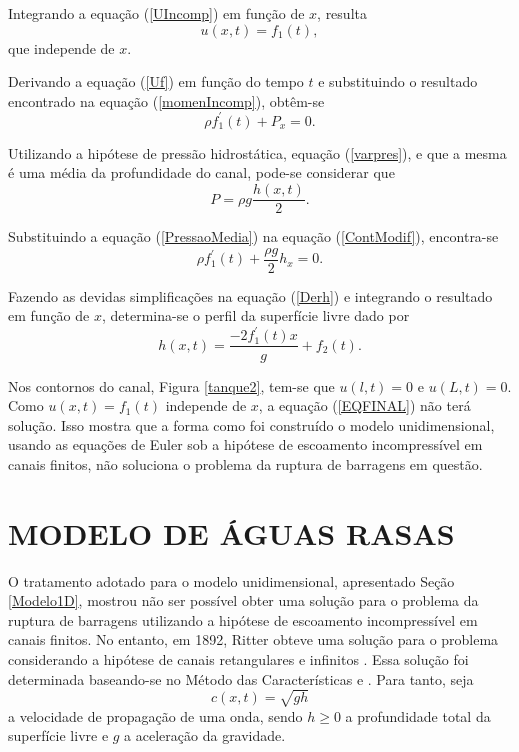 Integrando a equação (\ref{UIncomp}) em função de $x$, resulta
\begin{equation} \label{Uf}
u(x,t)= f_1 (t),
\end{equation}
que independe de $x$.

Derivando a equação (\ref{Uf}) em função do tempo $t$ e substituindo o resultado encontrado na equação (\ref{momenIncomp}), obtêm-se
\begin{equation} \label{ContModif}
\rho f^{'}_{1}(t)+ P_x =0.
\end{equation}

Utilizando a hipótese de pressão hidrostática, equação (\ref{varpres}), e que a mesma é uma média da profundidade do canal, pode-se considerar que
\begin{equation}\label{PressaoMedia}
P = \rho g \frac{h(x,t)}{2}.
\end{equation} 

Substituindo a equação (\ref{PressaoMedia}) na equação (\ref{ContModif}), encontra-se
\begin{equation}\label{Derh}
\rho f^{'}_{1}(t) + \frac{\rho g}{2} h_x=0.
\end{equation}

Fazendo as devidas simplificações na equação (\ref{Derh}) e integrando o resultado em função de $x$, determina-se o perfil da superfície livre dado por
\begin{equation} \label{EQFINAL}
h(x,t) = \frac{-2f^{'}_{1}(t)x}{g} + f_2(t).
\end{equation}

Nos contornos do canal, Figura \ref{tanque2}, tem-se que $u(l,t)=0$ e $u(L,t) = 0$. Como $u(x,t)=f_1(t)$ independe de $x$, a equação (\ref{EQFINAL}) não terá solução. Isso mostra que a forma como foi construído o modelo unidimensional, usando as equações de Euler sob a hipótese de escoamento incompressível em canais finitos, não soluciona o problema da ruptura de barragens em questão.

\section{MODELO DE ÁGUAS RASAS} \label{ModeloAR}

O tratamento adotado para o modelo unidimensional, apresentado Seção \ref{Modelo1D}, mostrou não ser possível obter uma solução para o problema da ruptura de barragens utilizando a hipótese de escoamento incompressível em canais finitos. No entanto, em 1892, Ritter obteve uma solução para o problema considerando a hipótese de canais retangulares e infinitos \cite{Sakkas}. Essa solução foi determinada baseando-se no Método das Características \cite{Zenchuk} e \cite{Henderson}. Para tanto, seja
\begin{equation} \label{velonda}
c(x,t)= \sqrt{gh}
\end{equation}
a velocidade de propagação de uma onda, sendo $h \geq 0$ a profundidade total da superfície livre e $g$ a aceleração da gravidade. 

